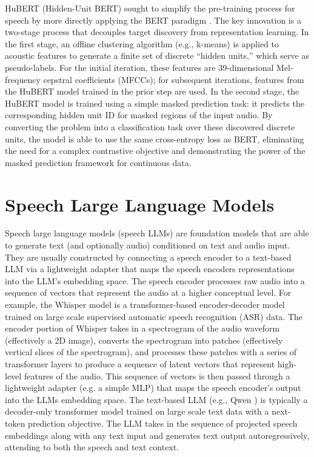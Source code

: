 \documentclass{report}
\begin{document}
HuBERT (Hidden-Unit BERT) sought to simplify the pre-training process for speech by more directly applying the BERT paradigm \citep{hsu2021hubertselfsupervisedspeechrepresentation}. The key innovation is a two-stage process that decouples target discovery from representation learning. In the first stage, an offline clustering algorithm (e.g., k-means) is applied to acoustic features to generate a finite set of discrete ``hidden units,'' which serve as pseudo-labels. For the initial iteration, these features are 39-dimensional Mel-frequency cepstral coefficients (MFCCs); for subsequent iterations, features from the HuBERT model trained in the prior step are used. In the second stage, the HuBERT model is trained using a simple masked prediction task: it predicts the corresponding hidden unit ID for masked regions of the input audio. By converting the problem into a classification task over these discovered discrete units, the model is able to use the same cross-entropy loss as BERT, eliminating the need for a complex contrastive objective and demonstrating the power of the masked prediction framework for continuous data.

\section{Speech Large Language Models}
\label{sec:speech_large_language_models}
Speech large language models (speech LLMs) are foundation models that are able to generate text (and optionally audio) conditioned on text and audio input. They are usually constructed by connecting a speech encoder to a text-based LLM via a lightweight adapter that maps the speech encoders representations into the LLM’s embedding space. The speech encoder processes raw audio into a sequence of vectors that represent the audio at a higher conceptual level. For example, the Whisper model \citep{radford2022robustspeechrecognitionlargescale} is a transformer-based encoder-decoder model trained on large scale supervised automatic speech recognition (ASR) data. The encoder portion of Whisper takes in a spectrogram of the audio waveform (effectively a 2D image), converts the spectrogram into patches (effectively vertical slices of the spectrogram), and processes these patches with a series of transformer layers to produce a sequence of latent vectors that represent high-level features of the audio. This sequence of vectors is then passed through a lightweight adapter (e.g. a simple MLP) that maps the speech encoder’s output into the LLMs embedding space. The text-based LLM (e.g., Qwen \citep{chu2023qwenaudioadvancinguniversalaudio}) is typically a decoder-only transformer model trained on large scale text data with a next-token prediction objective. The LLM takes in the sequence of projected speech embeddings along with any text input and generates text output autoregressively, attending to both the speech and text context.
\end{document}

